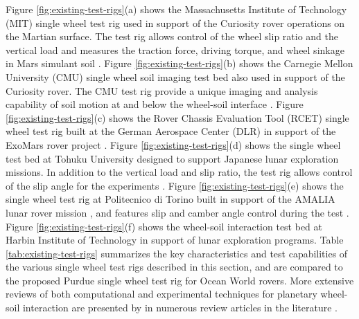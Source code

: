 \documentclass{article}
\begin{document}
Figure \ref{fig:existing-test-rigs}(a) shows the Massachusetts Institute of Technology (MIT) single wheel test rig used in support of the Curiosity rover operations on the Martian surface. The test rig allows control of the wheel slip ratio and the vertical load and measures the traction force, driving torque, and wheel sinkage in Mars simulant soil \cite{senatore2014modeling}. Figure \ref{fig:existing-test-rigs}(b) shows the Carnegie Mellon University (CMU) single wheel soil imaging test bed also used in support of the Curiosity rover. The CMU test rig provide a unique imaging and analysis capability of soil motion at and below the wheel-soil interface \cite{moreland2012soil}. Figure \ref{fig:existing-test-rigs}(c) shows the Rover Chassis Evaluation Tool (RCET) single wheel test rig built at the German Aerospace Center (DLR) in support of the ExoMars rover project \cite{gallina2014parameter}.  Figure \ref{fig:existing-test-rigs}(d) shows the single wheel test bed at Tohuku University designed to support Japanese lunar exploration missions. In addition to the vertical load and slip ratio, the test rig allows control of the slip angle for the experiments \cite{ishigami2008terramechanics}. Figure \ref{fig:existing-test-rigs}(e) shows the single wheel test rig at Politecnico di Torino built in support of the AMALIA lunar rover mission \cite{della2010amalia}, and features slip and camber angle control during the test \cite{genta2016testing}. Figure \ref{fig:existing-test-rigs}(f) shows the wheel-soil interaction test bed at Harbin Institute of Technology in support of lunar exploration programs. Table \ref{tab:existing-test-rigs} summarizes the key characteristics and test capabilities of the various single wheel test rigs described in this section, and are compared to the proposed Purdue single wheel test rig for Ocean World rovers. More extensive reviews of both computational and experimental techniques for planetary wheel-soil interaction  are presented by in numerous review articles in the literature \cite{ding2011planetary,schafer2010planetary,sreenivasulu2014terramechanics}.
\end{document}
